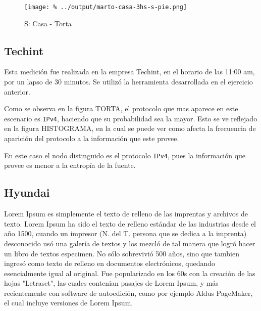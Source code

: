 \documentclass[final,narroweqnarray,inline]{ieee}
\begin{document}
  \begin{figure}[h]\begin{center}
    \texttt{[image: \%
    ../output/marto-casa-3hs-s-pie.png]}
    \vspace{-3em}
    \caption{S: Casa - Torta}
    \label{marto-casa-3hs-s-pie}
  \end{center}\end{figure}

  \subsection{Techint}
  Esta medición fue realizada en la empresa Techint, en el horario de las
  11:00 am, por un lapso de 30 minutos. Se utilizó la herramienta
  desarrollada en el ejercicio anterior. 

  
  Como se observa en la figura TORTA, el protocolo que mas aparece en
  este escenario es \texttt{IPv4}, haciendo que su probabilidad sea la
  mayor. Esto se ve reflejado en la figura HISTOGRAMA, en la cual se puede
  ver como afecta la frecuencia de aparición del protocolo a la información
  que este provee.

  En este caso el nodo distinguido es el protocolo \texttt{IPv4}, pues la
  información que provee es menor a la entropía de la fuente. 
  \subsection{Hyundai}

Lorem Ipsum es simplemente el texto de relleno de las imprentas y archivos de texto. Lorem Ipsum ha sido el texto de relleno estándar de las industrias desde el año 1500, cuando un impresor (N. del T. persona que se dedica a la imprenta) desconocido usó una galería de textos y los mezcló de tal manera que logró hacer un libro de textos especimen. No sólo sobrevivió 500 años, sino que tambien ingresó como texto de relleno en documentos electrónicos, quedando esencialmente igual al original. Fue popularizado en los 60s con la creación de las hojas "Letraset", las cuales contenian pasajes de Lorem Ipsum, y más recientemente con software de autoedición, como por ejemplo Aldus PageMaker, el cual incluye versiones de Lorem Ipsum.
\end{document}
